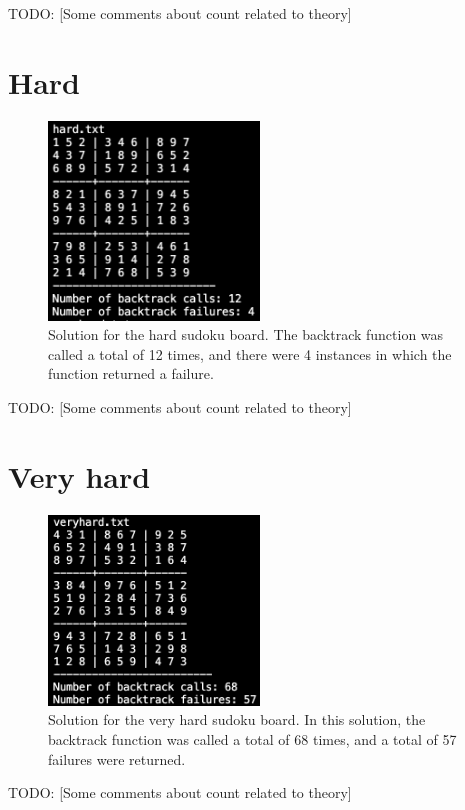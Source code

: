 \documentclass{article}
\begin{document}
    TODO: [Some comments about count related to theory]

    \section*{Hard}

    \begin{figure}[H]
        \centering
        \includegraphics[width=0.5\textwidth]{Images/hard.png}
        \caption[Hard solution]{Solution for the hard sudoku board. The backtrack function was called a total of 12 times, and there were 4 instances in which the function returned a failure.}
        \label{fig:Hard solution}
    \end{figure}

    TODO: [Some comments about count related to theory]

    \section*{Very hard}

    \begin{figure}[H]
        \centering
        \includegraphics[width=0.5\textwidth]{Images/very_hard.png}
        \caption[Very hard solution]{Solution for the very hard sudoku board. In this solution, the backtrack function was called a total of 68 times, and a total of 57 failures were returned.}
        \label{fig:Very hard solution}
    \end{figure}

    TODO: [Some comments about count related to theory]

\end{document}
